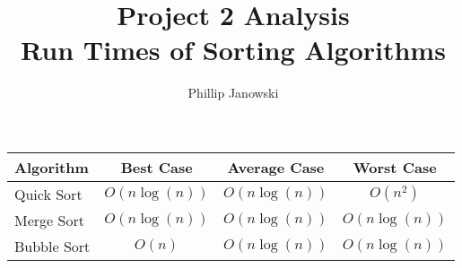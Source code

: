 \documentclass[]{article}
\title{%
	Project 2 Analysis\\
	\large Run Times of Sorting Algorithms}
\author{Phillip Janowski}
\begin{document}
\maketitle

\begin{center}
	\begin{tabular} {|l|c|c|c|}
		\hline
		Algorithm & Best Case & Average Case & Worst Case\\
		\hline 
		Quick Sort & $ O(n \log(n)) $ & $ O(n\log(n)) $ & $ O(n^2) $\\
		\hline
		Merge Sort & $ O(n \log(n)) $ & $ O(n\log(n)) $ & $ O(n \log(n)) $\\
		\hline
		Bubble Sort & $ O(n) $ & $ O(n\log(n)) $ & $ O(n \log(n)) $\\
	\end{tabular}
\end{center}

\section{}
\end{document}
